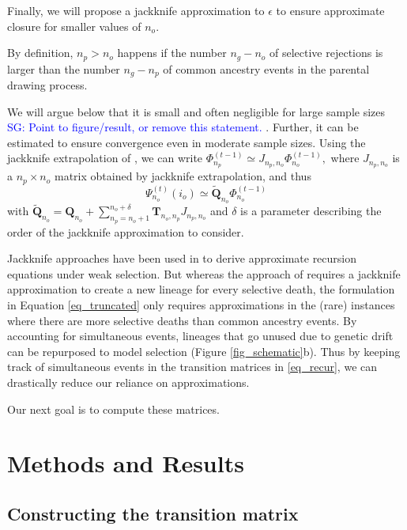 \documentclass[9pt,twocolumn,twoside,lineno]{gsajnl}
\newcommand{\afs}[2]{\Phi_{#1}^{(#2)}}
\newcommand{\afsPsi}[2]{\Psi_{#1}^{(#2)}}
\newcommand{\sgcomment}[1]{\textcolor{blue}{SG: #1}}
\begin{document}
Finally, we will propose a jackknife approximation to $\epsilon$ to ensure approximate closure for smaller values of $n_o$. 


By definition, $n_p>n_o$ happens if the number $n_g-n_o$ of selective rejections is larger than the number $n_g-n_p$ of common ancestry events in the parental drawing process.   



We will argue below that it is small and often 
negligible for large sample sizes \sgcomment{Point to figure/result, or remove this statement. }. 
Further, it can be estimated to ensure convergence even in moderate sample sizes.  
Using the jackknife extrapolation of \citep{Gravel2016}, we can write  
$\afs{n_p}{t-1} \simeq J_{n_p,n_o} \afs{n_o}{t-1},$ where $J_{n_p,n_o}$ is a $n_p\times n_o$
matrix obtained by jackknife extrapolation, and thus
\begin{equation}
  \afsPsi{n_o}{t}(i_o) \simeq \tilde{\mathbf{Q}}_{n_o}        \afs{n_o}{t-1}
\label{eq_truncated_jack}
\end{equation}
with  $ \tilde{\mathbf{Q}}_{n_o} =  \mathbf{Q}_{n_o}  +   \sum_{n_p=n_o+1 }^{n_o+\delta}  \mathbf{T}_{n_o,n_p} J_{n_p,n_o}$
and $\delta$ is a parameter describing the order of the jackknife approximation to consider. 

Jackknife approaches have been used in \cite{JouganousEtAl2017} to derive approximate 
recursion equations under weak selection. But whereas the approach of \cite{JouganousEtAl2017} 
requires a jackknife approximation to create a new lineage for every selective death, the formulation in Equation \eqref{eq_truncated}
only requires approximations in the (rare) instances where there are more selective deaths than 
common ancestry events. By accounting for simultaneous events, lineages that go unused due to genetic drift can be repurposed to model selection (Figure \ref{fig_schematic}b).
Thus by keeping track of simultaneous events in the transition matrices
in \eqref{eq_recur}, we can drastically reduce our reliance on approximations.

Our next goal is to compute these matrices.

\section{Methods and Results}
\label{sec_methods}

\subsection{Constructing the transition matrix}
\label{subsec_trans_mat}
\end{document}
